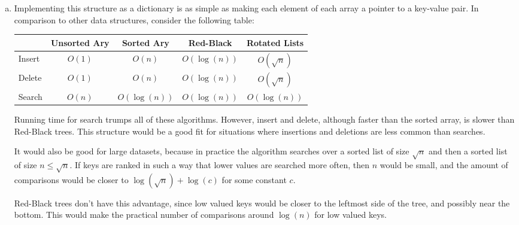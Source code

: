 \documentclass[letterpaper,10pt]{article}
\begin{document}
\begin{enumerate}
\begin{enumerate}[a)]
		\item Implementing this structure as a dictionary is as simple as making each element of each array a pointer to a key-value pair. In comparison to other data structures, consider the following table:

		\begin{tabular}{|l|c|c|c|c|}
		  \hline
		   & Unsorted Ary & Sorted Ary & Red-Black & Rotated Lists \\
		  \hline \hline
		  Insert & $O(1)$ & $O(n)$ & $O(\log(n))$ & $O(\sqrt{n})$ \\
		  \hline
		  Delete & $O(1)$ & $O(n)$ & $O(\log(n))$ & $O(\sqrt{n})$ \\
		  \hline
		  Search & $O(n)$ & $O(\log(n))$ & $O(\log(n))$ & $O(\log(n))$ \\
		  \hline
		\end{tabular}

		Running time for search trumps all of these algorithms. However, insert and delete, although faster than the sorted array, is slower than Red-Black trees. This structure would be a good fit for situations where insertions and deletions are less common than searches.

		It would also be good for large datasets, because in practice the algorithm searches over a sorted list of size $\sqrt{n}$ and then a sorted list of size $n \leq \sqrt{n}$. If keys are ranked in such a way that lower values are searched more often, then $n$ would be small, and the amount of comparisons would be closer to $\log(\sqrt{n}) + \log(c)$ for some constant $c$.

		Red-Black trees don't have this advantage, since low valued keys would be closer to the leftmost side of the tree, and possibly near the bottom. This would make the practical number of comparisons around $\log(n)$ for low valued keys.

	\end{enumerate}

\end{enumerate}
\end{document}
